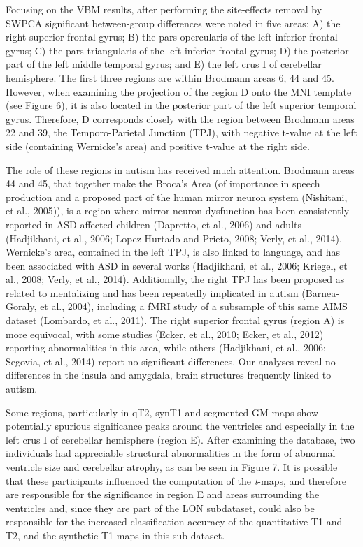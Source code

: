 	Focusing on the \ac{VBM} results, after performing the site-effects removal
	by SWPCA significant between-group differences were noted in five
	areas: A) the right superior frontal gyrus; B) the pars opercularis of
	the left inferior frontal gyrus; C) the pars triangularis of the left
	inferior frontal gyrus; D) the posterior part of the left middle
	temporal gyrus; and E) the left crus I of cerebellar hemisphere. The
	first three regions are within Brodmann areas 6, 44 and 45. However,
	when examining the projection of the region D onto the MNI template
	(see Figure 6), it is also located in the posterior part of the left
	superior temporal gyrus. Therefore, D corresponds closely with the
	region between Brodmann areas 22 and 39, the Temporo-Parietal Junction
	(TPJ), with negative t-value at the left side (containing
	Wernicke's area) and positive t-value at the right
	side. 


	The role of these regions in autism has received much attention.
	Brodmann areas 44 and 45, that together make the Broca’s Area (of
	importance in speech production and a proposed part of the human mirror
	neuron system (Nishitani, et al., 2005)), is a region where mirror
	neuron dysfunction has been consistently reported in ASD-affected
	children (Dapretto, et al., 2006) and adults (Hadjikhani, et al., 2006;
	Lopez-Hurtado and Prieto, 2008; Verly, et al., 2014). Wernicke’s area,
	contained in the left TPJ, is also linked to language, and has been
	associated with ASD in several works (Hadjikhani, et al., 2006;
	Kriegel, et al., 2008; Verly, et al., 2014). Additionally, the right
	TPJ has been proposed as related to mentalizing and has been repeatedly
	implicated in autism (Barnea-Goraly, et al., 2004), including a f\ac{MRI}
	study of a subsample of this same AIMS dataset (Lombardo, et al.,
	2011). The right superior frontal gyrus (region A) is more equivocal,
	with some studies (Ecker, et al., 2010; Ecker, et al., 2012) reporting
	abnormalities in this area, while others (Hadjikhani, et al., 2006;
	Segovia, et al., 2014) report no significant differences. Our analyses
	reveal no differences in the insula and amygdala, brain structures
	frequently linked to autism. 


	Some regions, particularly in \ac{qT2}, \ac{synT1} and segmented \ac{GM} maps show
	potentially spurious significance peaks around the ventricles and
	especially in the left crus I of cerebellar hemisphere (region E).
	After examining the database, two individuals had appreciable
	structural abnormalities in the form of abnormal ventricle size and
	cerebellar atrophy, as can be seen in Figure 7. It is possible that
	these participants influenced the computation of the \textit{t}{}-maps,
	and therefore are responsible for the significance in region E and
	areas surrounding the ventricles and, since they are part of the LON
	subdataset, could also be responsible for the increased classification
	accuracy of the quantitative T1 and T2, and the synthetic T1 maps in
	this sub-dataset.


